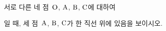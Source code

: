 서로 다른 네 점~$\mathrm{O}$, $\mathrm{A}$, $\mathrm{B}$, $\mathrm{C}$에 대하여 \par\smallskip{}\par\smallskip\noindent 일 때, 세 점~$\mathrm{A}$, $\mathrm{B}$, $\mathrm{C}$가 한 직선 위에 있음을 보이시오.
